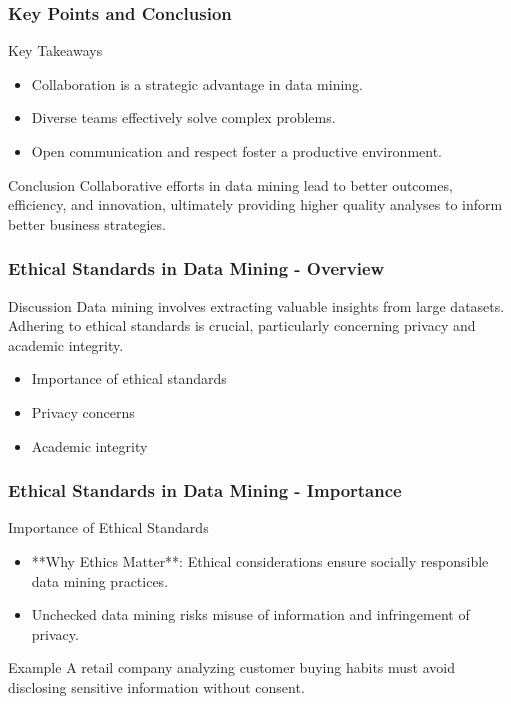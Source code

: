 \documentclass[aspectratio=169]{beamer}
\begin{document}
\begin{frame}[fragile]
    \frametitle{Key Points and Conclusion}
    \begin{block}{Key Takeaways}
        \begin{itemize}
            \item Collaboration is a strategic advantage in data mining.
            \item Diverse teams effectively solve complex problems.
            \item Open communication and respect foster a productive environment.
        \end{itemize}
    \end{block}

    \begin{block}{Conclusion}
        Collaborative efforts in data mining lead to better outcomes, efficiency, and innovation, ultimately providing higher quality analyses to inform better business strategies.
    \end{block}
\end{frame}

\begin{frame}[fragile]
    \frametitle{Ethical Standards in Data Mining - Overview}
    \begin{block}{Discussion}
        Data mining involves extracting valuable insights from large datasets. 
        Adhering to ethical standards is crucial, particularly concerning privacy and academic integrity.
    \end{block}

    \begin{itemize}
        \item Importance of ethical standards
        \item Privacy concerns
        \item Academic integrity
    \end{itemize}
\end{frame}

\begin{frame}[fragile]
    \frametitle{Ethical Standards in Data Mining - Importance}
    \begin{block}{Importance of Ethical Standards}
        \begin{itemize}
            \item **Why Ethics Matter**: Ethical considerations ensure socially responsible data mining practices.
            \item Unchecked data mining risks misuse of information and infringement of privacy.
        \end{itemize}
    \end{block}

    \begin{exampleblock}{Example}
        A retail company analyzing customer buying habits must avoid disclosing sensitive information without consent.
    \end{exampleblock}
\end{frame}
\end{document}
